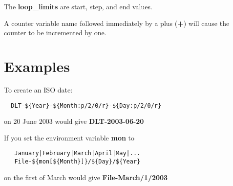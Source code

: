 The {\bf loop\_limits} are start, step, and end values. 

A counter variable name followed immediately by a plus ({\bf +}) will cause
the counter to be incremented by one. 

\section{Examples}

To create an ISO date: 

\footnotesize
\begin{verbatim}
  DLT-${Year}-${Month:p/2/0/r}-${Day:p/2/0/r}
\end{verbatim}
\normalsize

on 20 June 2003 would give {\bf DLT-2003-06-20} 

If you set the environment variable {\bf mon} to 

\footnotesize
\begin{verbatim}
   January|February|March|April|May|...
   File-${mon[${Month}]}/${Day}/${Year}
\end{verbatim}
\normalsize

on the first of March would give {\bf File-March/1/2003 } 
